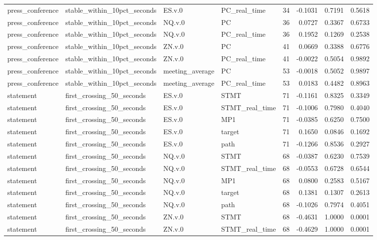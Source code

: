 \begin{tabular}{llllrrrr}
press_conference & stable_within_10pct_seconds & ES.v.0 & PC_real_time & 34 & -0.1031 & 0.7191 & 0.5618 \\
press_conference & stable_within_10pct_seconds & NQ.v.0 & PC & 36 & 0.0727 & 0.3367 & 0.6733 \\
press_conference & stable_within_10pct_seconds & NQ.v.0 & PC_real_time & 36 & 0.1952 & 0.1269 & 0.2538 \\
press_conference & stable_within_10pct_seconds & ZN.v.0 & PC & 41 & 0.0669 & 0.3388 & 0.6776 \\
press_conference & stable_within_10pct_seconds & ZN.v.0 & PC_real_time & 41 & -0.0022 & 0.5054 & 0.9892 \\
press_conference & stable_within_10pct_seconds & meeting_average & PC & 53 & -0.0018 & 0.5052 & 0.9897 \\
press_conference & stable_within_10pct_seconds & meeting_average & PC_real_time & 53 & 0.0183 & 0.4482 & 0.8963 \\
statement & first_crossing_50_seconds & ES.v.0 & STMT & 71 & -0.1161 & 0.8325 & 0.3349 \\
statement & first_crossing_50_seconds & ES.v.0 & STMT_real_time & 71 & -0.1006 & 0.7980 & 0.4040 \\
statement & first_crossing_50_seconds & ES.v.0 & MP1 & 71 & -0.0385 & 0.6250 & 0.7500 \\
statement & first_crossing_50_seconds & ES.v.0 & target & 71 & 0.1650 & 0.0846 & 0.1692 \\
statement & first_crossing_50_seconds & ES.v.0 & path & 71 & -0.1266 & 0.8536 & 0.2927 \\
statement & first_crossing_50_seconds & NQ.v.0 & STMT & 68 & -0.0387 & 0.6230 & 0.7539 \\
statement & first_crossing_50_seconds & NQ.v.0 & STMT_real_time & 68 & -0.0553 & 0.6728 & 0.6544 \\
statement & first_crossing_50_seconds & NQ.v.0 & MP1 & 68 & 0.0800 & 0.2583 & 0.5167 \\
statement & first_crossing_50_seconds & NQ.v.0 & target & 68 & 0.1381 & 0.1307 & 0.2613 \\
statement & first_crossing_50_seconds & NQ.v.0 & path & 68 & -0.1026 & 0.7974 & 0.4051 \\
statement & first_crossing_50_seconds & ZN.v.0 & STMT & 68 & -0.4631 & 1.0000 & 0.0001 \\
statement & first_crossing_50_seconds & ZN.v.0 & STMT_real_time & 68 & -0.4629 & 1.0000 & 0.0001 \\

\end{tabular}
